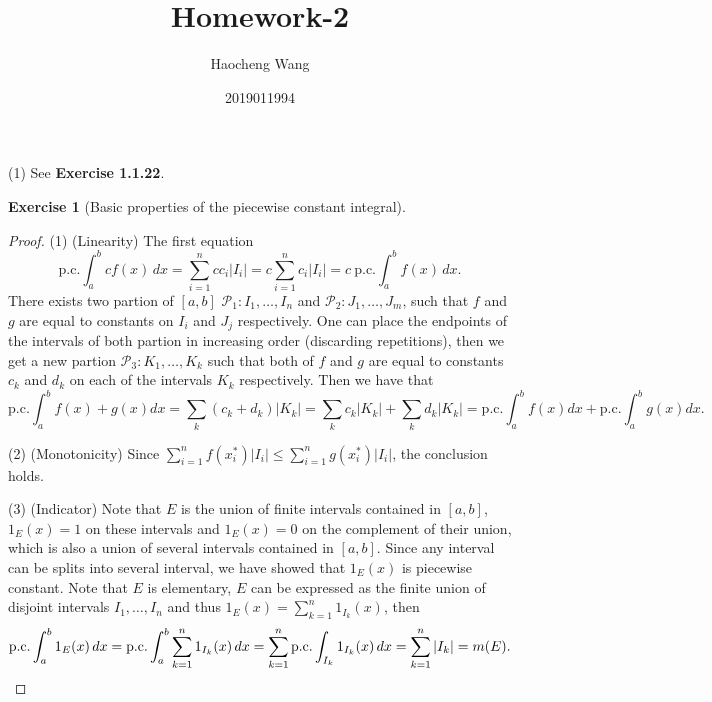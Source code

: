 \documentclass{article}
\title{Homework-2}
\author{Haocheng Wang \and 2019011994}
\newtheorem{ex}{Exercise}[subsection]
\begin{document}
\maketitle

\noindent(1) See {\bfseries Exercise 1.1.22}.

\setcounter{ex}{20}
\begin{ex}[Basic properties of the piecewise constant integral]\end{ex}
\begin{proof}
(1) (Linearity) The first equation $$
\mathrm{p.c.} \int_a^b cf(x)\, dx = \sum_{i = 1}^n cc_i|I_i| = c\sum_{i = 1}^n c_i |I_i| = c\ \mathrm{p.c.} 
\int_a^b f(x)\, dx.
$$There exists two partion of $[a, b]$ $\mathcal{P}_1: I_1, \dots, I_n$ and $\mathcal{P}_2: J_1, \dots, J_m$, such 
that $f$ and $g$ are equal to constants on $I_i$ and $J_j$ respectively. One 
can place the endpoints of the intervals of both partion in increasing order (discarding repetitions), then we get 
a new partion $\mathcal{P}_3: K_1, \dots, K_k$ such that both of $f$ and $g$ are equal to constants $c_k$ and $d_k$
on each of the intervals $K_k$ respectively. Then we have that $$
\mathrm{p.c.} \int_a^b f(x) + g(x) dx = \sum_{k} (c_k + d_k)|K_k| = \sum_k c_k|K_k| + \sum_{k}d_k |K_k|
= \mathrm{p.c.}\int_a^b f(x) dx + \mathrm{p.c.}\int_a^b g(x) dx.
$$

(2) (Monotonicity) Since $\sum_{i = 1}^n f(x_i^*) |I_i| \leq \sum_{i = 1}^n g(x_i^*)|I_i|$, the conclusion holds.

(3) (Indicator) Note that $E$ is the union of finite intervals contained in $[a, b]$, $1_E(x) = 1$ on these intervals
and $1_E(x) = 0$ on the complement of their union, which is also a union of several intervals contained in $[a, b]$.
Since any interval can be splits into several interval, we have showed that $1_E(x)$ is piecewise constant. Note that 
$E$ is elementary, $E$ can be expressed as the finite union of disjoint intervals $I_1, \dots, I_n$ and thus 
$1_E(x) = \sum_{k = 1}^n 1_{I_k}(x)$, then\[
\mathrm{p.c.} \int_a^b 1_E(x)\, dx = \mathrm{p.c.} \int_a^b \sum_{k = 1}^n 1_{I_k}(x)\, dx = 
\sum_{k = 1}^n \mathrm{p.c.}\int_{I_k} 1_{I_k}(x)\, dx = \sum_{k = 1}^n |I_k| = m(E). \qedhere
\]
\end{proof}
\end{document}
